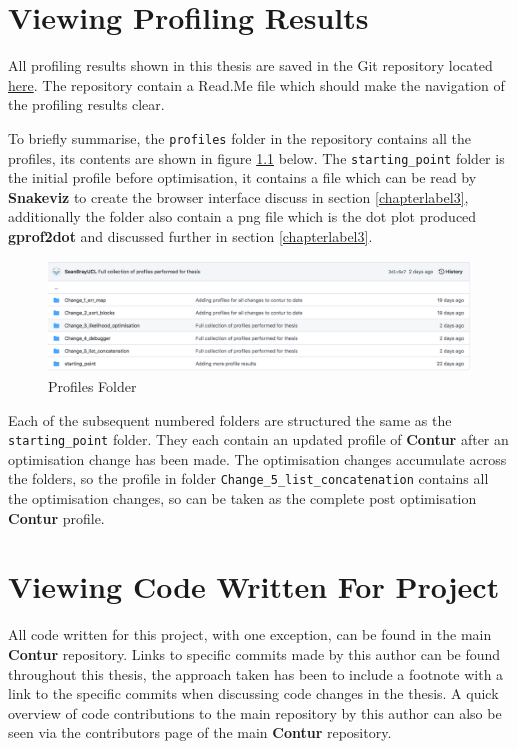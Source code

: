 {}

\appendix
\chapter{Viewing Profiling Results}
\label{appendixlabel1}
All profiling results shown in this thesis are saved in the Git repository located \href{https://github.com/SeanBrayUCL/contur_thesis}{here}. The repository contain a Read.Me file which should make the navigation of the profiling results clear. 

To briefly summarise, the \texttt{profiles} folder in the repository contains all the profiles, its contents are shown in figure \ref{fig:profiles_folder} below. The \texttt{starting\_point} folder is the initial profile before optimisation, it contains a  file which can be read by \textbf{Snakeviz} to create the browser interface discuss in section \ref{chapterlabel3}, additionally the folder also contain a png file which is the dot plot produced \textbf{gprof2dot} and discussed further in section \ref{chapterlabel3}.

\begin{figure}[H]
\centering
\includegraphics[scale=0.3]{plots/profiles_folder.png}
\caption{Profiles Folder}
\label{fig:profiles_folder}
\end{figure}

Each of the subsequent numbered folders are structured the same as the \texttt{starting\_point} folder. They each contain an updated profile of \textbf{Contur} after an optimisation change has been made. The optimisation changes accumulate across the folders, so the profile in folder \texttt{Change\_5\_list\_concatenation} contains all the optimisation changes, so can be taken as the complete post optimisation \textbf{Contur} profile.

\chapter{Viewing Code Written For Project}
All code written for this project, with one exception, can be found in the main \textbf{Contur} repository\cite{contur_main}. Links to specific commits made by this author can be found throughout this thesis, the approach taken has been to include a footnote with a link to the specific commits when discussing code changes in the thesis. A quick overview of code contributions to the main repository by this author can also be seen via the contributors page of the main \textbf{Contur} repository\cite{contur_main}.

